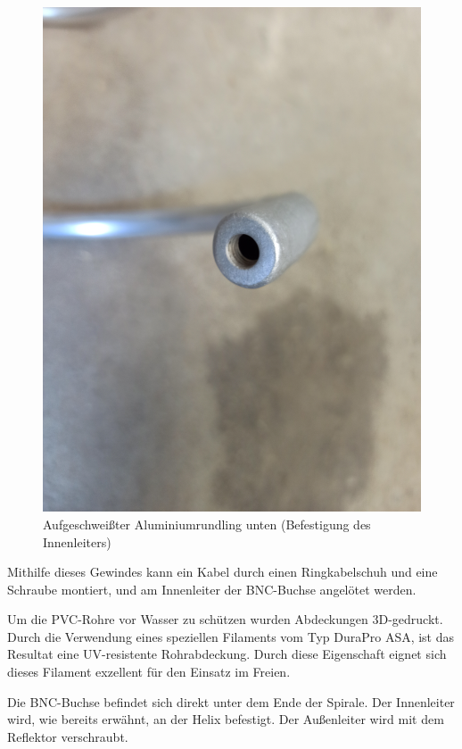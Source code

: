 \begin{figure}[h!]
	\centering
	\includegraphics[width=\textwidth]{../ref/Anschluss-unten.jpg}
	\caption{Aufgeschweißter Aluminiumrundling unten (Befestigung des Innenleiters)}
	\label{fig:Deckel-Helix-Unten}
\end{figure}

Mithilfe dieses Gewindes kann ein Kabel durch einen Ringkabelschuh und eine Schraube montiert, und am Innenleiter der BNC-Buchse angelötet werden.

Um die PVC-Rohre vor Wasser zu schützen wurden Abdeckungen 3D-gedruckt. Durch die Verwendung eines speziellen Filaments vom Typ DuraPro ASA, ist das Resultat eine UV-resistente Rohrabdeckung. Durch diese Eigenschaft eignet sich dieses Filament exzellent für den Einsatz im Freien.


Die BNC-Buchse befindet sich direkt unter dem Ende der Spirale. Der Innenleiter wird, wie bereits erwähnt, an der Helix befestigt. Der Außenleiter wird mit dem Reflektor verschraubt.

